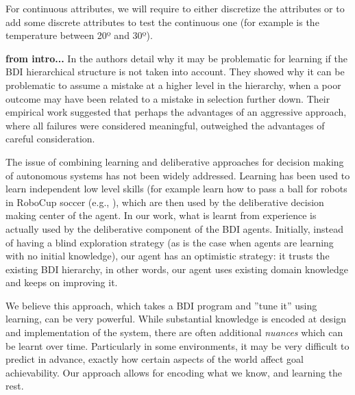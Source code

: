 



For continuous attributes, we will require to either discretize the attributes or
to add some discrete attributes to test the continuous one (for example is the
temperature between 20º and 30º).



\bigskip\bigskip\bigskip\bigskip
\textbf{from intro...}
In \cite{APSS08} the authors detail why it may be problematic for
learning if the BDI hierarchical structure is not taken into account.
They showed why it can be problematic to assume a mistake at a
higher level in the hierarchy, when a poor outcome may have been
related to a mistake in selection further down.  Their
empirical work suggested that perhaps the advantages of an aggressive
approach, where all failures were considered meaningful, outweighed
the advantages of careful consideration.


The issue of combining learning and deliberative approaches for decision
making of autonomous systems has not been widely addressed. Learning
has been used to learn independent low level skills (for example learn
how to pass a ball for robots in RoboCup soccer (e.g., \cite{Riedmiller01}), which are
then used by the deliberative decision making center of the agent.  In
our work, what is learnt from experience is actually used by the
deliberative component of the BDI agents. Initially, instead of having
a blind exploration strategy 
(as is the case when agents are learning with no initial knowledge), 
our agent has an optimistic strategy: it trusts the existing BDI hierarchy, in other
words, our agent uses existing domain knowledge and keeps on improving
it.

We believe this approach, which takes a BDI program and 
''tune it'' using learning, can be very powerful. While substantial
knowledge is encoded at design and implementation of the system, there
are often additional \textit{nuances} which can be learnt over
time. Particularly in some environments, it may be very difficult to
predict in advance, exactly how certain aspects of the world affect
goal achievability. Our approach allows for encoding what we know,
and learning the rest.

